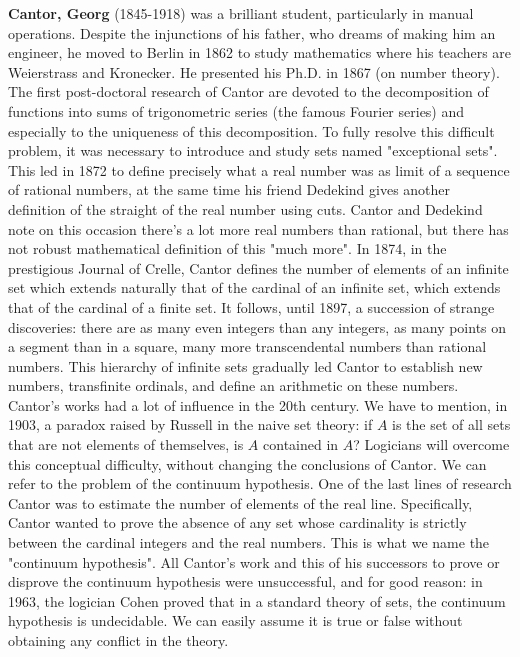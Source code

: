 \textbf{Cantor, Georg }(1845-1918) was a brilliant student, particularly in manual operations. Despite the injunctions of his father, who dreams of making him an engineer, he moved to Berlin in 1862 to study mathematics where his teachers are Weierstrass and Kronecker. He presented his Ph.D. in 1867 (on number theory). The first post-doctoral research of Cantor are devoted to the decomposition of functions into sums of trigonometric series (the famous Fourier series) and especially to the uniqueness of this decomposition. To fully resolve this difficult problem, it was necessary to introduce and study sets named "exceptional sets". This led in 1872 to define precisely what a real number was as limit of a sequence of rational numbers, at the same time his friend Dedekind gives another definition of the straight of the real number using cuts. Cantor and Dedekind note on this occasion there's a lot more real numbers than rational, but there has not robust mathematical definition of this "much more". In 1874, in the prestigious Journal of Crelle, Cantor defines the number of elements of an infinite set which extends naturally that of the cardinal of an infinite set, which extends that of the cardinal of a finite set. It follows, until 1897, a succession of strange discoveries: there are as many even integers than any integers, as many points on a segment than in a square, many more transcendental numbers than rational numbers. This hierarchy of infinite sets gradually led Cantor to establish new numbers, transfinite ordinals, and define an arithmetic on these numbers. Cantor's works had a lot of influence in the 20th century. We have to mention, in 1903, a paradox raised by Russell in the naive set theory: if $A$ is the set of all sets that are not elements of themselves, is $A$ contained in $A$? Logicians will overcome this conceptual difficulty, without changing the conclusions of Cantor. We can refer to the problem of the continuum hypothesis. One of the last lines of research Cantor was to estimate the number of elements of the real line. Specifically, Cantor wanted to prove the absence of any set whose cardinality is strictly between the cardinal integers and the real numbers. This is what we name the "continuum hypothesis". All Cantor's work and this of his successors to prove or disprove the continuum hypothesis were unsuccessful, and for good reason: in 1963, the logician Cohen proved that in a standard theory of sets, the continuum hypothesis is undecidable. We can easily assume it is true or false without obtaining any conflict in the theory.

